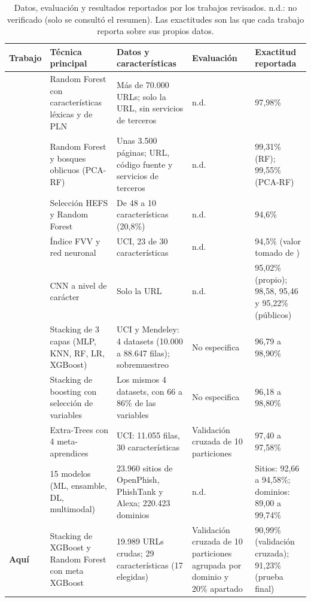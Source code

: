 \begin{table}[t]
\caption{Datos, evaluación y resultados reportados por los trabajos revisados. n.d.: no verificado (solo se consultó el resumen). Las exactitudes son las que cada trabajo reporta sobre sus propios datos.}
\label{tab:literatura}
\centering
\footnotesize
\renewcommand{\arraystretch}{1.15}
\setlength{\tabcolsep}{4pt}
\begin{tabular}{p{1.1cm} p{3.6cm} p{4.3cm} p{2.8cm} p{3.4cm}}
\hline
\textbf{Trabajo} & \textbf{Técnica principal} & \textbf{Datos y características} & \textbf{Evaluación} & \textbf{Exactitud reportada}\\
\hline
\cite{sahingoz2019machine} & Random Forest con características léxicas y de PLN & Más de 70.000 URLs; solo la URL, sin servicios de terceros & n.d. & 97,98\%\\
\cite{rao2019detection} & Random Forest y bosques oblicuos (PCA-RF) & Unas 3.500 páginas; URL, código fuente y servicios de terceros & n.d. & 99,31\% (RF); 99,55\% (PCA-RF)\\
\cite{chiew2019hybrid} & Selección HEFS y Random Forest & De 48 a 10 características (20,8\%) & n.d. & 94,6\%\\
\cite{zhu2019ofsnn} & Índice FVV y red neuronal & UCI, 23 de 30 características & n.d. & 94,5\% (valor tomado de \cite{kalabarige2023boosting})\\
\cite{aljofey2020effective} & CNN a nivel de carácter & Solo la URL & n.d. & 95,02\% (propio); 98,58, 95,46 y 95,22\% (públicos)\\
\cite{kalabarige2022multilayer} & Stacking de 3 capas (MLP, KNN, RF, LR, XGBoost) & UCI y Mendeley: 4 datasets (10.000 a 88.647 filas); sobremuestreo & No especifica & 96,79 a 98,90\%\\
\cite{kalabarige2023boosting} & Stacking de boosting con selección de variables & Los mismos 4 datasets, con 66 a 86\% de las variables & No especifica & 96,18 a 98,80\%\\
\cite{alsariera2020ai} & Extra-Trees con 4 meta-aprendices & UCI: 11.055 filas, 30 características & Validación cruzada de 10 particiones & 97,40 a 97,58\%\\
\cite{duy2024study} & 15 modelos (ML, ensamble, DL, multimodal) & 23.960 sitios de OpenPhish, PhishTank y Alexa; 220.423 dominios & n.d. & Sitios: 92,66 a 94,58\%; dominios: 89,00 a 99,74\%\\
\hline
\textbf{Aquí} & Stacking de XGBoost y Random Forest con meta XGBoost & 19.989 URLs crudas; 29 características (17 elegidas) & Validación cruzada de 10 particiones agrupada por dominio y 20\% apartado & 90,99\% (validación cruzada); 91,23\% (prueba final)\\
\hline
\end{tabular}
\end{table}

